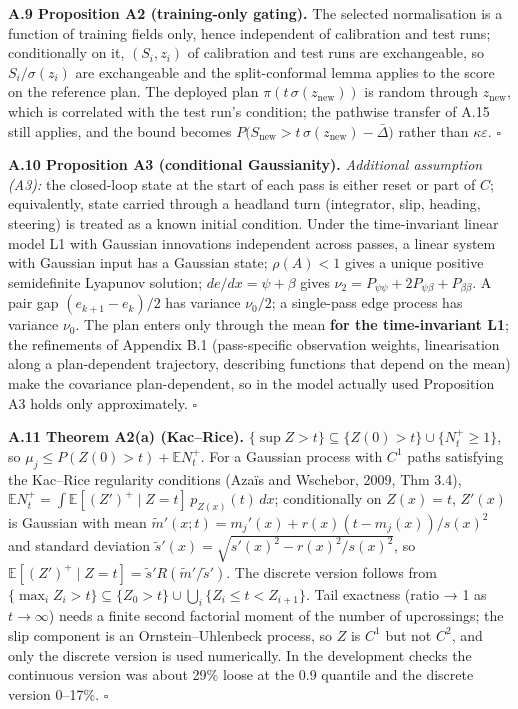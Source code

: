 \documentclass[preprint,12pt,authoryear]{elsarticle}
\begin{document}
\textbf{A.9 Proposition A2 (training-only gating).} The selected normalisation is a function of training fields only, hence independent of calibration and test runs; conditionally on it, \((S_i,z_i)\) of calibration and test runs are exchangeable, so \(S_i/\sigma(z_i)\) are exchangeable and the split-conformal lemma applies to the score on the reference plan. The deployed plan \(\pi(t\,\sigma(z_\mathrm{new}))\) is random through \(z_\mathrm{new}\), which is correlated with the test run's condition; the pathwise transfer of A.15 still applies, and the bound becomes \(P\big(S_\mathrm{new}>t\,\sigma(z_\mathrm{new})-\bar\Delta\big)\) rather than \(\kappa\varepsilon\). \(\square\)

\textbf{A.10 Proposition A3 (conditional Gaussianity).} \emph{Additional assumption (A3):} the closed-loop state at the start of each pass is either reset or part of \(C\); equivalently, state carried through a headland turn (integrator, slip, heading, steering) is treated as a known initial condition. Under the time-invariant linear model L1 with Gaussian innovations independent across passes, a linear system with Gaussian input has a Gaussian state; \(\rho(A)<1\) gives a unique positive semidefinite Lyapunov solution; \(de/dx=\psi+\beta\) gives \(\nu_2=P_{\psi\psi}+2P_{\psi\beta}+P_{\beta\beta}\). A pair gap \((e_{k+1}-e_k)/2\) has variance \(\nu_0/2\); a single-pass edge process has variance \(\nu_0\). The plan enters only through the mean \textbf{for the time-invariant L1}; the refinements of Appendix B.1 (pass-specific observation weights, linearisation along a plan-dependent trajectory, describing functions that depend on the mean) make the covariance plan-dependent, so in the model actually used Proposition A3 holds only approximately. \(\square\)

\textbf{A.11 Theorem A2(a) (Kac--Rice).} \(\{\sup Z>t\}\subseteq\{Z(0)>t\}\cup\{N_t^+\ge1\}\), so \(\mu_j\le P(Z(0)>t)+\mathbb EN_t^+\). For a Gaussian process with \(C^1\) paths satisfying the Kac--Rice regularity conditions (Azaïs and Wschebor, 2009, Thm 3.4), \(\mathbb EN_t^+=\int\mathbb E[(Z')^+\mid Z=t]\,p_{Z(x)}(t)\,dx\); conditionally on \(Z(x)=t\), \(Z'(x)\) is Gaussian with mean \(\tilde m'(x;t)=m_j'(x)+r(x)(t-m_j(x))/s(x)^2\) and standard deviation \(\tilde s'(x)=\sqrt{s'(x)^2-r(x)^2/s(x)^2}\), so \(\mathbb E[(Z')^+\mid Z=t]=\tilde s'R(\tilde m'/\tilde s')\). The discrete version follows from \(\{\max_iZ_i>t\}\subseteq\{Z_0>t\}\cup\bigcup_i\{Z_i\le t<Z_{i+1}\}\). Tail exactness (ratio → 1 as \(t\to\infty\)) needs a finite second factorial moment of the number of upcrossings; the slip component is an Ornstein--Uhlenbeck process, so \(Z\) is \(C^1\) but not \(C^2\), and only the discrete version is used numerically. In the development checks the continuous version was about 29\% loose at the 0.9 quantile and the discrete version 0--17\%. \(\square\)
\end{document}
